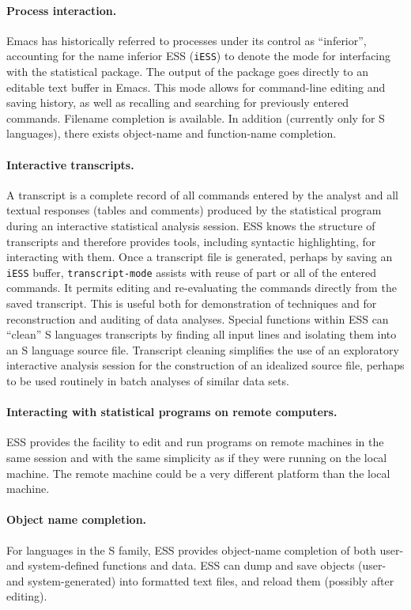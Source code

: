 \documentclass{article}
\newcommand{\stexttt}[1]{{\small\texttt{#1}}}
\begin{document}
\paragraph{Process interaction.}
Emacs has historically referred to processes under its control as
``inferior'', accounting for the name inferior ESS (\stexttt{iESS}) to
denote the mode for interfacing with the statistical package.  The
output of the package goes directly to an editable text buffer in Emacs.
This mode allows for command-line editing and saving history, as well as
recalling and searching for previously entered commands.  Filename
completion is available.  In addition (currently only for S languages),
there exists object-name and function-name completion.

\paragraph{Interactive transcripts.}
A transcript is a complete record of all commands entered by the
analyst and all textual responses (tables and comments) produced by
the statistical program during an interactive statistical analysis
session.  ESS knows the structure of transcripts and therefore
provides tools, including syntactic highlighting, for interacting with
them.  Once a transcript file is generated, perhaps by saving an
\stexttt{iESS} buffer, \stexttt{transcript-mode} assists with reuse of
part or all of the entered commands.  It permits editing and
re-evaluating the commands directly from the saved transcript.  This
is useful both for demonstration of techniques and for reconstruction
and auditing of data analyses.  Special functions within ESS can
``clean'' S languages transcripts by finding all input lines and
isolating them into an S language source file.  Transcript cleaning
simplifies the use of an exploratory interactive analysis session for
the construction of an idealized source file, perhaps to be used
routinely in batch analyses of similar data sets.

\paragraph{Interacting with statistical programs on remote computers.}
ESS provides the facility to edit and run programs on remote machines
in the same session and with the same simplicity as if they were
running on the local machine.  The remote machine could be a very
different platform than the local machine.

\paragraph{Object name completion.}
For languages in the S family,
ESS provides object-name completion of both user- and
system-defined functions and data.  ESS can dump and save objects
(user- and system-generated) into formatted text files,
and reload them (possibly after editing).
\end{document}
